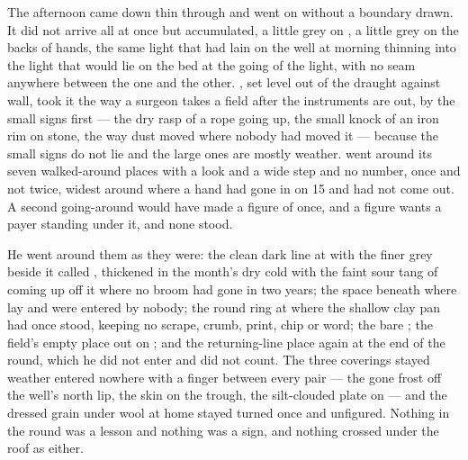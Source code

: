 The afternoon came down thin through  and went on without a boundary drawn. It did not arrive all at once but accumulated, a little grey on , a little grey on the backs of hands, the same light that had lain on the well at morning thinning into the light that would lie on the bed at the going of the light, with no seam anywhere between the one and the other. , set level out of the draught against  wall, took it the way a surgeon takes a field after the instruments are out, by the small signs first --- the dry rasp of a rope going up, the small knock of an iron rim on stone, the way dust moved where nobody had moved it --- because the small signs do not lie and the large ones are mostly weather.  went around its seven walked-around places with a look and a wide step and no number, once and not twice, widest around  where a hand had gone in on  15 and had not come out. A second going-around would have made a figure of once, and a figure wants a payer standing under it, and none stood.

He went around them as they were: the clean dark line at  with the finer grey beside it called , thickened in the month's dry cold with the faint sour tang of  coming up off it where no broom had gone in two years; the space beneath  where  lay and were entered by nobody; the round ring at  where the shallow clay pan had once stood, keeping no scrape, crumb, print, chip or word; the bare ; the field's empty place out on ; and the returning-line place again at the end of the round, which he did not enter and did not count. The three coverings stayed weather entered nowhere with a finger between every pair --- the gone frost off the well's north lip, the skin on the trough, the silt-clouded plate on  --- and the dressed grain under wool at home stayed turned once and unfigured. Nothing in the round was a lesson and nothing was a sign, and nothing crossed under the roof as either.

